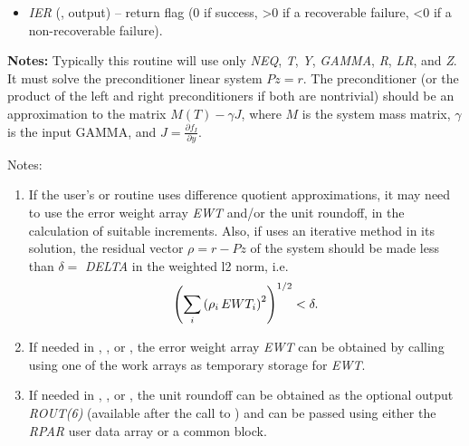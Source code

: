 \documentclass[letterpaper,10pt,english]{sphinxmanual}
\begin{document}
\begin{fulllineitems}
\begin{description}
\begin{itemize}
\item {} 
\emph{IER}  (, output) -- return flag  (0 if success, \textgreater{}0 if a recoverable
failure, \textless{}0 if a non-recoverable failure).

\end{itemize}

\end{description}

\textbf{Notes:}
Typically this routine will use only \emph{NEQ}, \emph{T}, \emph{Y}, \emph{GAMMA}, \emph{R},
\emph{LR}, and \emph{Z}.  It must solve the preconditioner linear system
\(Pz = r\).  The preconditioner (or the product of the left and
right preconditioners if both are nontrivial) should be an
approximation to the matrix  \(M(T) - \gamma J\), where
\(M\) is the system mass matrix, \(\gamma\) is the input
GAMMA, and \(J = \frac{\partial f_I}{\partial y}\).

\end{fulllineitems}


Notes:
\begin{enumerate}
\item {} 
If the user's {\hyperref[f_interface/Usage:f/_/FARKJTIMES]{\emph{}}} or {\hyperref[f_interface/Usage:f/_/FARKPSET]{\emph{}}} routine
uses difference quotient approximations, it may need to use the
error weight array \emph{EWT} and/or the unit roundoff, in the
calculation of suitable increments. Also, if {\hyperref[f_interface/Usage:f/_/FARKPSOL]{\emph{}}}
uses an iterative method in its solution, the residual vector
\(\rho = r - Pz\) of the system should be made less than
\(\delta =\) \emph{DELTA} in the weighted l2 norm, i.e.
\begin{gather}
\begin{split}\left(\sum_i \left(\rho_i\, EWT_i\right)^2 \right)^{1/2} < \delta.\end{split}\notag
\end{gather}
\item {} 
If needed in {\hyperref[f_interface/Usage:f/_/FARKJTIMES]{\emph{}}}, {\hyperref[f_interface/Usage:f/_/FARKPSOL]{\emph{}}}, or
{\hyperref[f_interface/Usage:f/_/FARKPSET]{\emph{}}}, the error weight array \emph{EWT} can be
obtained by calling {\hyperref[f_interface/Optional_output:f/_/FARKGETERRWEIGHTS]{\emph{}}} using one of the
work arrays as temporary storage for \emph{EWT}.

\item {} 
If needed in {\hyperref[f_interface/Usage:f/_/FARKJTIMES]{\emph{}}}, {\hyperref[f_interface/Usage:f/_/FARKPSOL]{\emph{}}}, or
{\hyperref[f_interface/Usage:f/_/FARKPSET]{\emph{}}}, the unit roundoff can be obtained as the
optional output \emph{ROUT(6)} (available after the call to
{\hyperref[f_interface/Usage:f/_/FARKMALLOC]{\emph{}}}) and can be passed using either the \emph{RPAR}
user data array or a common block.

\end{enumerate}
\end{document}
